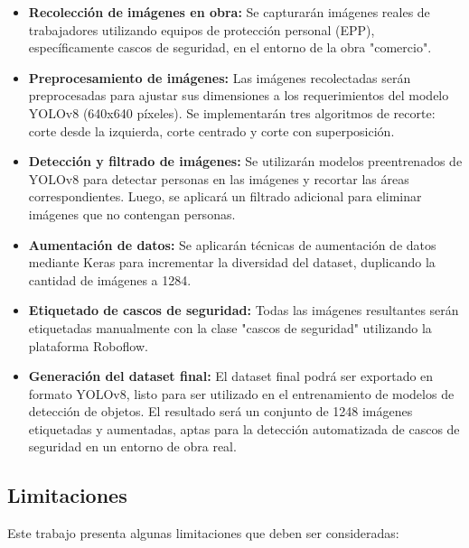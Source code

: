 \begin{itemize}
  \item \textbf{Recolección de imágenes en obra:} Se capturarán imágenes reales de trabajadores utilizando equipos de protección personal (EPP), específicamente cascos de seguridad, en el entorno de la obra "comercio".
  \item \textbf{Preprocesamiento de imágenes:} Las imágenes recolectadas serán preprocesadas para ajustar sus dimensiones a los requerimientos del modelo YOLOv8 (640x640 píxeles). Se implementarán tres algoritmos de recorte: corte desde la izquierda, corte centrado y corte con superposición.
  \item \textbf{Detección y filtrado de imágenes:} Se utilizarán modelos preentrenados de YOLOv8 para detectar personas en las imágenes y recortar las áreas correspondientes. Luego, se aplicará un filtrado adicional para eliminar imágenes que no contengan personas.
  \item \textbf{Aumentación de datos:} Se aplicarán técnicas de aumentación de datos mediante Keras para incrementar la diversidad del dataset, duplicando la cantidad de imágenes a 1284.
  \item \textbf{Etiquetado de cascos de seguridad:} Todas las imágenes resultantes serán etiquetadas manualmente con la clase "cascos de seguridad" utilizando la plataforma Roboflow.
  \item \textbf{Generación del dataset final:} El dataset final podrá ser exportado en formato YOLOv8, listo para ser utilizado en el entrenamiento de modelos de detección de objetos. El resultado será un conjunto de 1248 imágenes etiquetadas y aumentadas, aptas para la detección automatizada de cascos de seguridad en un entorno de obra real.
\end{itemize}

\subsection{Limitaciones}

Este trabajo presenta algunas limitaciones que deben ser consideradas:

